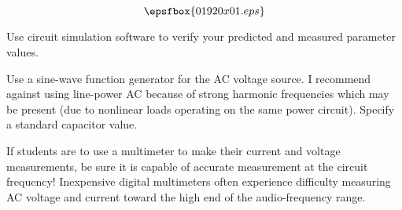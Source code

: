 

$$\epsfbox{01920x01.eps}$$

\vfil \eject






Use circuit simulation software to verify your predicted and measured parameter values.







Use a sine-wave function generator for the AC voltage source.  I recommend against using line-power AC because of strong harmonic frequencies which may be present (due to nonlinear loads operating on the same power circuit).  Specify a standard capacitor value.

If students are to use a multimeter to make their current and voltage measurements, be sure it is capable of accurate measurement at the circuit frequency!  Inexpensive digital multimeters often experience difficulty measuring AC voltage and current toward the high end of the audio-frequency range.




